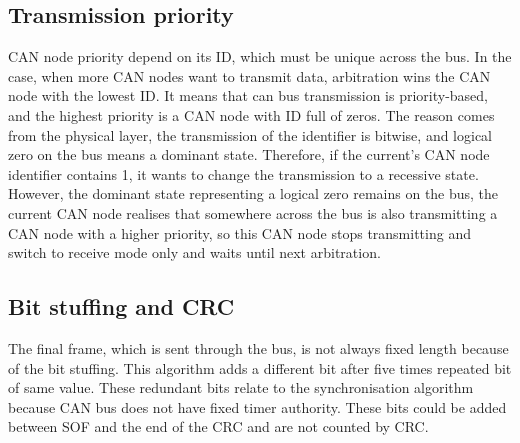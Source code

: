 \documentclass{ctuthesis}
\begin{document}
  \subsection{Transmission priority}
   CAN node priority depend on its ID, which must be unique across the bus. In the case, when more CAN nodes want to transmit data, arbitration wins the CAN node with the lowest ID. It means that can bus transmission is priority-based, and the highest priority is a CAN node with ID full of zeros. The reason comes from the physical layer, the transmission of the identifier is bitwise, and logical zero on the bus means a dominant state. Therefore, if the current's CAN node identifier contains 1, it wants to change the transmission to a recessive state. However, the dominant state representing a logical zero remains on the bus, the current CAN node realises that somewhere across the bus is also transmitting a CAN node with a higher priority, so this CAN node stops transmitting and switch to receive mode only and waits until next arbitration.
  \subsection{Bit stuffing and CRC}
   The final frame, which is sent through the bus, is not always fixed length because of the bit stuffing. This algorithm adds a different bit after five times repeated bit of same value. These redundant bits relate to the synchronisation algorithm because CAN bus does not have fixed timer authority. These bits could be added between SOF and the end of the  CRC and are not counted by CRC\cite{can_crc}.
\end{document}
